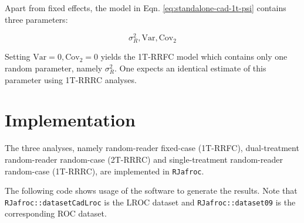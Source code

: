 \documentclass[
]{book}
\begin{document}
Apart from fixed effects, the model in Eqn. \eqref{eq:standalone-cad-1t-psi} contains three parameters:

\begin{equation}
\sigma_R^2, \text{Var}, \text{Cov}_2
\label{eq:standalone-cad-1t-parms}
\end{equation}

Setting \(\text{Var} = 0, \text{Cov}_2 = 0\) yields the 1T-RRFC model which contains only one random parameter, namely \(\sigma_R^2\). One expects an identical estimate of this parameter using 1T-RRRC analyses.

\hypertarget{standalone-cad-radiologists-computational-details}{%
\section{Implementation}\label{standalone-cad-radiologists-computational-details}}

The three analyses, namely random-reader fixed-case (1T-RRFC), dual-treatment random-reader random-case (2T-RRRC) and single-treatment random-reader random-case (1T-RRRC), are implemented in \texttt{RJafroc}.

The following code shows usage of the software to generate the results. Note that \texttt{RJafroc::datasetCadLroc} is the LROC dataset and \texttt{RJafroc::dataset09} is the corresponding ROC dataset.
\end{document}
